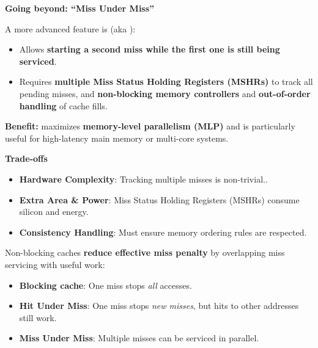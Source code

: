 \highspace
\begin{flushleft}
    \textcolor{Green3}{\faIcon{\speedIcon} \textbf{Going beyond: ``Miss Under Miss''}}
\end{flushleft}
A more advanced feature is  (aka ):
\begin{itemize}
    \item Allows \textbf{starting a second miss while the first one is still being serviced}.
    \item Requires \textbf{multiple Miss Status Holding Registers (MSHRs)} to track all pending misses, and \textbf{non-blocking memory controllers} and \textbf{out-of-order handling} of cache fills.
\end{itemize}
\textcolor{Green3}{ \textbf{Benefit:}} maximizes \textbf{memory-level parallelism (MLP)} and is particularly useful for high-latency main memory or multi-core systems.

\highspace
\begin{flushleft}
    \textcolor{Red2}{ \textbf{Trade-offs}}
\end{flushleft}
\begin{itemize}
    \item[\textcolor{Red2}{\faIcon{times}}] \textbf{Hardware Complexity}: Tracking multiple misses is non-trivial..
    \item[\textcolor{Red2}{\faIcon{times}}] \textbf{Extra Area \& Power}: Miss Status Holding Registers (MSHRs) consume silicon and energy.
    \item[\textcolor{Red2}{\faIcon{times}}] \textbf{Consistency Handling}: Must ensure memory ordering rules are respected.
\end{itemize}

\highspace
Non-blocking caches \textbf{reduce effective miss penalty} by overlapping miss servicing with useful work:
\begin{itemize}
    \item \textbf{Blocking cache}: One miss stops \emph{all} accesses.
    \item \textbf{Hit Under Miss}: One miss stops \emph{new misses}, but hits to other addresses still work.
    \item \textbf{Miss Under Miss}: Multiple misses can be serviced in parallel.
\end{itemize}
